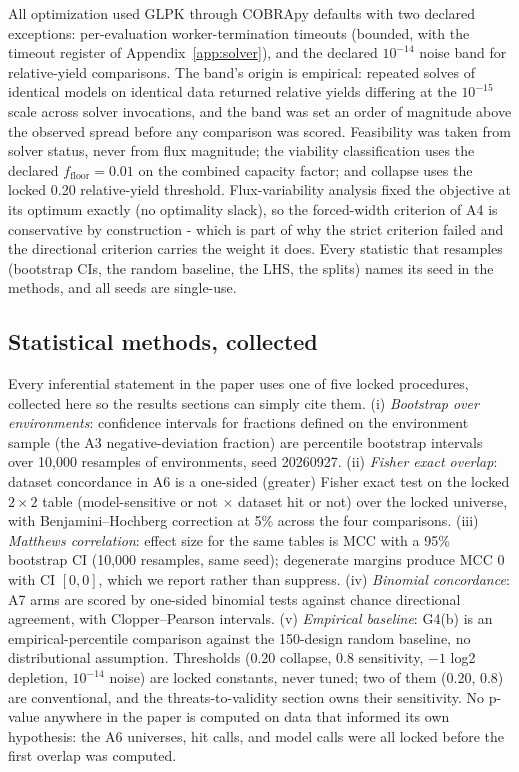 \documentclass[12pt]{article}
\begin{document}
All optimization used GLPK through COBRApy defaults with two declared
exceptions: per-evaluation worker-termination timeouts (bounded, with
the timeout register of Appendix~\ref{app:solver}), and the declared
$10^{-14}$ noise band for relative-yield comparisons. The band's
origin is empirical: repeated solves of identical models on identical
data returned relative yields differing at the $10^{-15}$ scale
across solver invocations, and the band was set an order of magnitude
above the observed spread before any comparison was scored. Feasibility
was taken from solver status, never from flux magnitude; the
viability classification uses the declared $f_{\mathrm{floor}}=0.01$
on the combined capacity factor; and collapse uses the locked 0.20
relative-yield threshold. Flux-variability analysis fixed the
objective at its optimum exactly (no optimality slack), so the
forced-width criterion of A4 is conservative by construction - which
is part of why the strict criterion failed and the directional
criterion carries the weight it does. Every statistic that resamples
(bootstrap CIs, the random baseline, the LHS, the splits) names its
seed in the methods, and all seeds are single-use.


\subsection{Statistical methods, collected}
\label{sec:statsdetail}

Every inferential statement in the paper uses one of five locked
procedures, collected here so the results sections can simply cite
them. (i) \emph{Bootstrap over environments}: confidence intervals
for fractions defined on the environment sample (the A3
negative-deviation fraction) are percentile bootstrap intervals over
10{,}000 resamples of environments, seed 20260927. (ii) \emph{Fisher
exact overlap}: dataset concordance in A6 is a one-sided (greater)
Fisher exact test on the locked $2\times2$ table (model-sensitive or
not $\times$ dataset hit or not) over the locked universe, with
Benjamini--Hochberg correction at 5\% across the four comparisons.
(iii) \emph{Matthews correlation}: effect size for the same tables is
MCC with a 95\% bootstrap CI (10{,}000 resamples, same seed);
degenerate margins produce MCC 0 with CI $[0,0]$, which we report
rather than suppress. (iv) \emph{Binomial concordance}: A7 arms are
scored by one-sided binomial tests against chance directional
agreement, with Clopper--Pearson intervals. (v) \emph{Empirical
baseline}: G4(b) is an empirical-percentile comparison against the
150-design random baseline, no distributional assumption. Thresholds
(0.20 collapse, 0.8 sensitivity, $-1$ log2 depletion, $10^{-14}$
noise) are locked constants, never tuned; two of them (0.20, 0.8)
are conventional, and the threats-to-validity section owns their
sensitivity. No p-value anywhere in the paper is computed on data
that informed its own hypothesis: the A6 universes, hit calls, and
model calls were all locked before the first overlap was computed.
\end{document}
